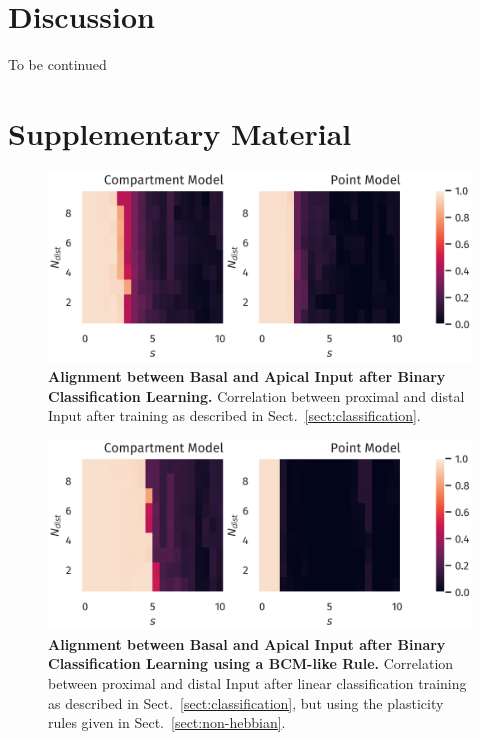 \documentclass[10pt,a4paper,twocolumn]{article}
\begin{document}
		\section{Discussion}
		
		To be continued
		
		\section{Supplementary Material}
		\begin{figure}
			\includegraphics[width=\columnwidth]{classification_correlation_dimension_scaling}
			\caption{{\bf Alignment between Basal and Apical Input after Binary Classification Learning.}
				Correlation between proximal and distal Input after training as described in 
				Sect.~\ref{sect:classification}.}
			\label{fig:classification_correlation}
		\end{figure}
		
		\begin{figure}
			\includegraphics[width=\columnwidth]{classification_correlation_dimension_scaling_bcm}
			\caption{{\bf Alignment between Basal and Apical Input after Binary Classification Learning
					using a BCM-like Rule.}
				Correlation between proximal and distal Input after linear classification 
				training as described in Sect.~\ref{sect:classification}, but using the plasticity
				rules given in Sect.~\ref{sect:non-hebbian}.}
			\label{fig:classification_correlation_bcm}
		\end{figure}
		
		
		
		
		
\end{document}
